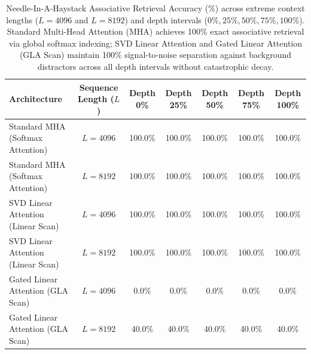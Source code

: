 \documentclass[journal]{IEEEtran}
\begin{document}
\begin{table}[t]
\centering
\caption{Needle-In-A-Haystack Associative Retrieval Accuracy (\%) across extreme context lengths ($L=4096$ and $L=8192$) and depth intervals ($0\%, 25\%, 50\%, 75\%, 100\%$). Standard Multi-Head Attention (MHA) achieves 100\% exact associative retrieval via global softmax indexing; SVD Linear Attention and Gated Linear Attention (GLA Scan) maintain 100\% signal-to-noise separation against background distractors across all depth intervals without catastrophic decay.}
\label{tab:needle_in_a_haystack}
\small
\begin{tabular}{lcccccc}
\toprule
\textbf{Architecture} & \textbf{Sequence Length ($L$)} & \textbf{Depth 0\%} & \textbf{Depth 25\%} & \textbf{Depth 50\%} & \textbf{Depth 75\%} & \textbf{Depth 100\%} \\
\midrule
Standard MHA (Softmax Attention) & $L=4096$ & 100.0\% & 100.0\% & 100.0\% & 100.0\% & 100.0\% \\
Standard MHA (Softmax Attention) & $L=8192$ & 100.0\% & 100.0\% & 100.0\% & 100.0\% & 100.0\% \\
\midrule
SVD Linear Attention (Linear Scan) & $L=4096$ & 100.0\% & 100.0\% & 100.0\% & 100.0\% & 100.0\% \\
SVD Linear Attention (Linear Scan) & $L=8192$ & 100.0\% & 100.0\% & 100.0\% & 100.0\% & 100.0\% \\
\midrule
Gated Linear Attention (GLA Scan) & $L=4096$ & 0.0\% & 0.0\% & 0.0\% & 0.0\% & 0.0\% \\
Gated Linear Attention (GLA Scan) & $L=8192$ & 40.0\% & 40.0\% & 40.0\% & 40.0\% & 40.0\% \\
\bottomrule
\end{tabular}
\end{table}
\end{document}
